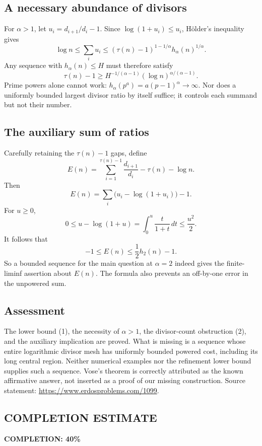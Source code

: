 \subsection*{A necessary abundance of divisors}
For $\alpha>1$, let $u_i=d_{i+1}/d_i-1$. Since $\log(1+u_i)\le u_i$, H\"older's inequality gives
\[
 \log n\le\sum_i u_i
 \le(\tau(n)-1)^{1-1/\alpha}h_\alpha(n)^{1/\alpha}.
\]
Any sequence with $h_\alpha(n)\le H$ must therefore satisfy
\[
 \tau(n)-1\ge H^{-1/(\alpha-1)}
                 (\log n)^{\alpha/(\alpha-1)}.
 \tag{2}
\]
Prime powers alone cannot work: $h_\alpha(p^a)=a(p-1)^\alpha\to\infty$. Nor does a uniformly bounded largest divisor ratio by itself suffice; it controls each summand but not their number.

\subsection*{The auxiliary sum of ratios}
Carefully retaining the $\tau(n)-1$ gaps, define
\[
 E(n)=\sum_{i=1}^{\tau(n)-1}\frac{d_{i+1}}{d_i}-\tau(n)-\log n.
\]
Then
\[
 E(n)=\sum_i\bigl(u_i-\log(1+u_i)\bigr)-1.
\]
For $u\ge0$,
\[
 0\le u-\log(1+u)=\int_0^u\frac t{1+t}\,dt\le\frac{u^2}{2}.
\]
It follows that
\[
 -1\le E(n)\le\frac12h_2(n)-1.
\]
So a bounded sequence for the main question at $\alpha=2$ indeed gives the finite-liminf assertion about $E(n)$. The formula also prevents an off-by-one error in the unpowered sum.

\subsection*{Assessment}
The lower bound (1), the necessity of $\alpha>1$, the divisor-count obstruction (2), and the auxiliary implication are proved. What is missing is a sequence whose entire logarithmic divisor mesh has uniformly bounded powered cost, including its long central region. Neither numerical examples nor the refinement lower bound supplies such a sequence. Vose's theorem is correctly attributed as the known affirmative answer, not inserted as a proof of our missing construction. Source statement: \url{https://www.erdosproblems.com/1099}.
\subsection*{COMPLETION ESTIMATE}
\textbf{COMPLETION: 40\%}
